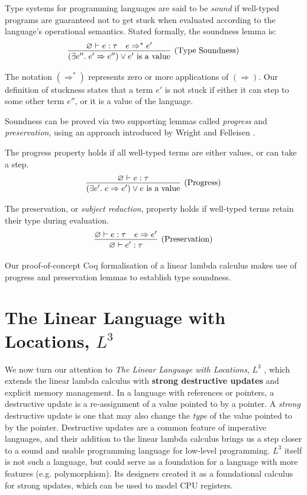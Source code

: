 \documentclass[]{unswthesis}
\let\emptyset\varnothing
\newcommand{\types}{\vdash}
\newcommand{\steps}{\Rightarrow}
\let\i\textit
\let\b\textbf
\let\t\text
\begin{document}

Type systems for programming languages are said to be \i{sound} if well-typed programs are guaranteed not to get stuck when evaluated according to the language's operational semantics. Stated formally, the soundness lemma is:
\begin{eqnarray*}
\infer[\t{(Type Soundness)}]
{(\exists e''. \; e' \steps e'') \lor \t{$e'$ is a value}}
{\emptyset \types e : \tau  &  e \steps^* e'}
\end{eqnarray*}

The notation $(\steps^*)$ represents zero or more applications of $(\steps)$. Our definition of stuckness states that a term $e'$ is not stuck if either it can step to some other term $e''$, or it is a value of the language.

Soundness can be proved via two supporting lemmas called \i{progress} and \i{preservation}, using an approach introduced by Wright and Felleisen \cite{wright94}.

The progress property holds if all well-typed terms are either values, or can take a step.
\begin{eqnarray*}
\infer[\t{(Progress)}]
{(\exists e'. \; e \steps e') \lor \t{$e$ is a value}}
{\emptyset \types e : \tau}
\end{eqnarray*}

The preservation, or \i{subject reduction}, property holds if well-typed terms retain their type during evaluation.
\begin{eqnarray*}
\infer[\t{(Preservation)}]
{\emptyset \types e' : \tau}
{\emptyset \types e : \tau  &  e \steps e'}
\end{eqnarray*}

Our proof-of-concept Coq formalisation of a linear lambda calculus makes use of progress and preservation lemmas to establish type soundness.

\section{The Linear Language with Locations, $L^3$}

We now turn our attention to \i{The Linear Language with Locations}, $L^3$ \cite{ahmed05}, which extends the linear lambda calculus with \b{strong destructive updates} and explicit memory management. In a language with references or pointers, a destructive update is a re-assignment of a value pointed to by a pointer. A \i{strong} destructive update is one that may also change the \i{type} of the value pointed to by the pointer. Destructive updates are a common feature of imperative languages, and their addition to the linear lambda calculus brings us a step closer to a sound and usable programming language for low-level programming. $L^3$ itself is not such a language, but could serve as a foundation for a language with more features (e.g. polymorphism). Its designers created it as a foundational calculus for strong updates, which can be used to model CPU registers.
\end{document}
